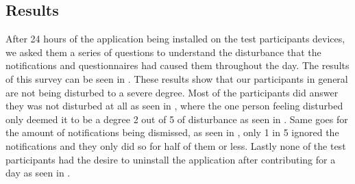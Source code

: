 \subsection{Results}
\label{sub:results}
After 24 hours of the application being installed on the test participants devices, we asked them a series of questions to understand the disturbance that the notifications and questionnaires had caused them throughout the day. The results of this survey can be seen in . These results show that our participants in general are not being disturbed to a severe degree. Most of the participants did answer they was not disturbed at all as seen in , where the one person feeling disturbed only deemed it to be a degree 2 out of 5 of disturbance as seen in . Same goes for the amount of notifications being dismissed, as seen in , only 1 in 5 ignored the notifications and they only did so for half of them or less. Lastly none of the test participants had the desire to uninstall the application after contributing for a day as seen in .


